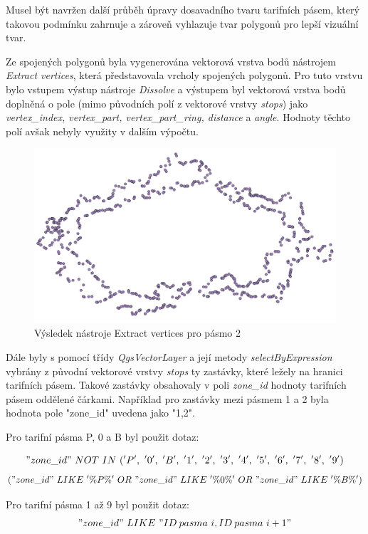 Musel být navržen další průběh úpravy dosavadního tvaru tarifních pásem, který takovou podmínku zahrnuje
a zároveň vyhlazuje tvar polygonů pro lepší vizuální tvar.  

Ze spojených polygonů byla vygenerována vektorová vrstva bodů nástrojem
\textit{Extract vertices}, která představovala vrcholy spojených polygonů. Pro tuto vrstvu
bylo vstupem výstup nástroje \textit{Dissolve} a výstupem byl vektorová vrstva bodů 
doplněná o pole (mimo původních polí z vektorové vrstvy \textit{stops}) jako \textit{vertex\_index,
vertex\_part, vertex\_part\_ring, distance} a \textit{angle}.
Hodnoty těchto polí avšak nebyly využity v dalším výpočtu.

\begin{figure}[H] \centering
    \includegraphics[width=400pt]{./pictures/vertices.png}
    \caption[Výsledek nástroje Extract vertices pro pásmo 2]{Výsledek nástroje Extract vertices pro pásmo 2}
	\label{fig:vertices}              
\end{figure} 

Dále byly s pomocí třídy \textit{QgsVectorLayer} a její metody \textit{selectByExpression} vybrány 
z původní vektorové vrstvy \textit{stops} ty zastávky, které ležely na hranici tarifních pásem.
Takové zastávky obsahovaly v poli \textit{zone\_id} hodnoty tarifních pásem oddělené čárkami.
Například pro zastávky mezi pásmem 1 a 2 byla hodnota pole "zone\_id" uvedena jako "1,2".

Pro tarifní pásma P, 0 a B byl použit dotaz:

\["zone\_id"\ NOT\ IN\ ('P',\ '0',\ 'B',\ '1',\ '2',\ '3',\ '4',\ '5',\ '6',\ '7',\ '8',\ '9')\]
\[("zone\_id"\ LIKE\ '\%P\%'\ OR\ "zone\_id"\ LIKE\ '\%0\%'\ OR\ "zone\_id"\ LIKE\ '\%B\%')\]

Pro tarifní pásma 1 až 9 byl použit dotaz:
\["zone\_id"\ LIKE\ "ID\: pasma\ i,ID\: pasma\ i+1"\]


